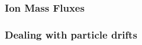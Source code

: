 %
%
%
%
%
%
%
%
%





\subsubsection{Ion Mass Fluxes}








\subsubsection{Dealing with particle drifts}




